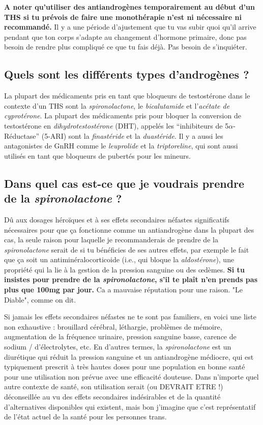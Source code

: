 \documentclass{article}
\begin{document}
\textbf{A noter qu'utiliser des antiandrogènes temporairement au début d'un THS si tu prévois de faire une monothérapie n'est ni nécessaire ni recommandé.} Il y a une période d'ajustement que tu vas subir quoi qu'il arrive pendant que ton corps s'adapte au changement d'hormone primaire, donc pas besoin de rendre plus compliqué ce que tu fais déjà. Pas besoin de s'inquiéter.

\subsection{Quels sont les différents types d'androgènes ?}

La plupart des médicaments pris en tant que bloqueurs de testostérone dans le contexte d'un THS sont la \textit{spironolactone}, le \textit{bicalutamide} et l'\textit{acétate de cyprotérone}. La plupart des médicaments pris pour bloquer la conversion de testostérone en \textit{dihydrotestostérone} (DHT), appelés les “inhibiteurs de 5$\alpha$-Réductase” (5-ARI) sont la \textit{finastéride} et la \textit{duastéride}. Il y a aussi les antagonistes de GnRH comme le \textit{leuprolide} et la \textit{triptoreline}, qui sont aussi utilisés en tant que bloqueurs de pubertés pour les mineurs. 

\subsection{Dans quel cas est-ce que je voudrais prendre de la \textit{spironolactone} ?}

Dû aux dosages héroïques et à ses effets secondaires néfastes significatifs nécessaires pour que ça fonctionne comme un antiandrogène dans la plupart des cas, la seule raison pour laquelle je recommanderais de prendre de la \textit{spironolactone} serait de si tu bénéficies de ses autres effets, par exemple le fait que ça soit un antiminéralocorticoide (i.e., qui bloque la \textit{aldostérone}), une propriété qui la lie à la gestion de la pression sanguine ou des œdèmes. \textbf{Si tu insistes pour prendre de la \textit{spironolactone}, s'il te plaît n'en prends pas plus que 100mg par jour.} Ca a mauvaise réputation pour une raison. "Le Diable", comme on dit. 

Si jamais les effets secondaires néfastes ne te sont pas familiers, en voici une liste non exhaustive : brouillard cérébral, léthargie, problèmes de mémoire, augmentation de la fréquence urinaire, pression sanguine basse, carence de sodium / d'électrolytes, etc. En d'autres termes, la \textit{spironolactone} est un diurétique qui réduit la pression sanguine et un antiandrogène médiocre, qui est typiquement prescrit à très hautes doses pour une population en bonne santé pour une utilisation non prévue avec une efficacité douteuse. Dans n'importe quel autre contexte de santé, son utilisation serait (ou DEVRAIT ETRE !) déconseillée au vu des effets secondaires indésirables et de la quantité d'alternatives disponibles qui existent, mais bon j'imagine que c'est représentatif de l'état actuel de la santé pour les personnes trans.  
\end{document}
